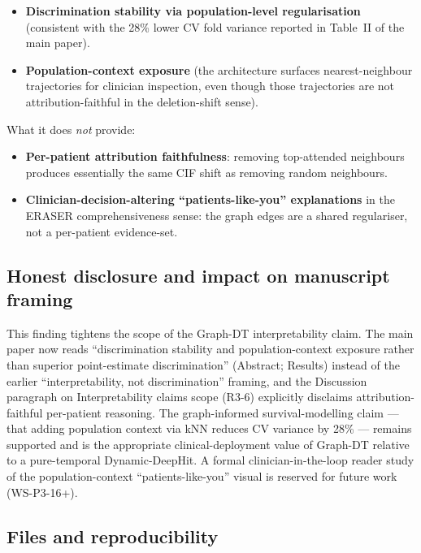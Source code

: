\documentclass[11pt]{article}
\begin{document}
\begin{itemize}\itemsep=0.2em
  \item \textbf{Discrimination stability via population-level regularisation} (consistent with the 28\% lower CV fold variance reported in Table~II of the main paper).
  \item \textbf{Population-context exposure} (the architecture surfaces nearest-neighbour trajectories for clinician inspection, even though those trajectories are not attribution-faithful in the deletion-shift sense).
\end{itemize}

\noindent What it does \emph{not} provide:

\begin{itemize}\itemsep=0.2em
  \item \textbf{Per-patient attribution faithfulness}: removing top-attended neighbours produces essentially the same CIF shift as removing random neighbours.
  \item \textbf{Clinician-decision-altering ``patients-like-you'' explanations} in the ERASER comprehensiveness sense: the graph edges are a shared regulariser, not a per-patient evidence-set.
\end{itemize}

\subsection*{Honest disclosure and impact on manuscript framing}

This finding tightens the scope of the Graph-DT interpretability claim. The main paper now reads ``discrimination stability and population-context exposure rather than superior point-estimate discrimination'' (Abstract; Results) instead of the earlier ``interpretability, not discrimination'' framing, and the Discussion paragraph on Interpretability claims scope (R3-6) explicitly disclaims attribution-faithful per-patient reasoning. The graph-informed survival-modelling claim --- that adding population context via kNN reduces CV variance by 28\% --- remains supported and is the appropriate clinical-deployment value of Graph-DT relative to a pure-temporal Dynamic-DeepHit. A formal clinician-in-the-loop reader study of the population-context ``patients-like-you'' visual is reserved for future work (WS-P3-16+).

\subsection*{Files and reproducibility}
\end{document}
